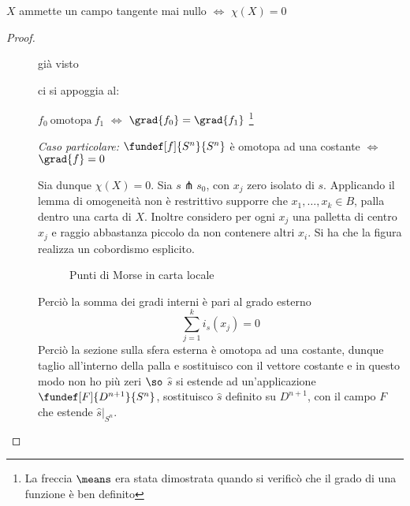 

\begin{teo}
$X$ ammette un campo tangente mai nullo $\iff$ $\chi(X) = 0$
\end{teo}

\begin{proof}
~
	\begin{description}
		\item[\proofrightarrow]
		già visto		
		\item[\proofleftarrow]
		ci si appoggia al:
		\begin{teo}
		$f_0~\text{omotopa}~f_1$ $\iff$ $\grad{f_0} = \grad{f_1}$
		\footnote{La freccia $\means$ era stata dimostrata quando si verificò che il grado di una funzione è ben definito}

		\emph{Caso particolare:} $\fundef[f]{S^n}{S^n}$ è omotopa ad una costante $\iff$ $\grad{f} = 0$
		\end{teo}
		Sia dunque $\chi(X) = 0$. Sia $s \pitchfork s_0$, con $x_j$ zero isolato di $s$.
		Applicando il lemma di omogeneità non è restrittivo supporre che $x_1, \dots, x_k \in B$, palla dentro una carta di $X$.
		Inoltre considero per ogni $x_j$ una palletta di centro $x_j$ e raggio abbastanza piccolo da non contenere altri $x_i$.
		Si ha che la figura realizza un cobordismo esplicito.

		\begin{figure}[h]
		\centering
		
		\caption{Punti di Morse in carta locale}
		\end{figure}

		Perciò la somma dei gradi interni è pari al grado esterno
		\begin{equation}
		\sum_{j=1}^k i_s(x_j) = 0
		\end{equation}
		Perciò la sezione sulla sfera esterna è omotopa ad una costante, dunque taglio all'interno della palla e sostituisco con il 			vettore costante e in questo modo non  ho più zeri $\so$ $\hat{s}$ si estende ad un'applicazione $\fundef[F]{D^{n+1}}{S^n}$, 			sostituisco $\hat{s}$ definito su $D^{n+1}$, con il campo $F$ che estende $\hat{s}|_{S^n}$.
	\end{description}
\end{proof}

